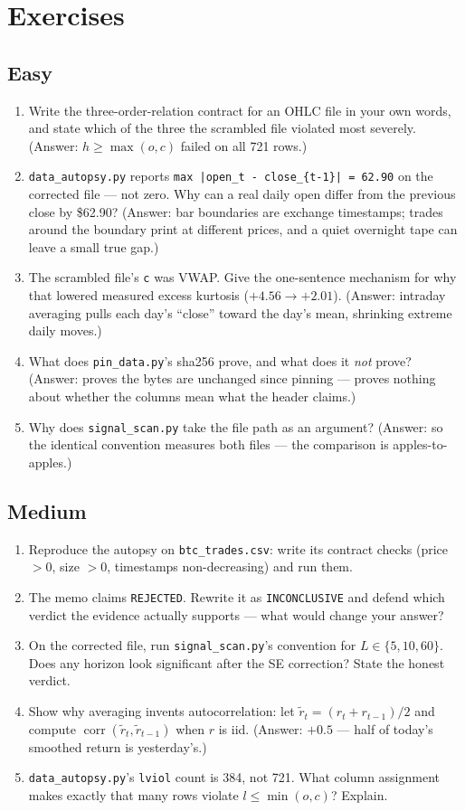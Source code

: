 \section*{Exercises}
\subsection*{Easy}
\begin{enumerate}
\item Write the three-order-relation contract for an OHLC file
in your own words, and state which of the three the scrambled
file violated most severely. (Answer: $h\ge\max(o,c)$ failed
on all 721 rows.)
\item \texttt{data\_autopsy.py} reports
\texttt{max |open\_t - close\_\{t-1\}| = 62.90} on the
corrected file --- not zero. Why can a real daily open differ
from the previous close by \$62.90? (Answer: bar boundaries are
exchange timestamps; trades around the boundary print at
different prices, and a quiet overnight tape can leave a small
true gap.)
\item The scrambled file's \texttt{c} was VWAP. Give the
one-sentence mechanism for why that lowered measured excess
kurtosis ($+4.56\to+2.01$). (Answer: intraday averaging pulls
each day's ``close'' toward the day's mean, shrinking extreme
daily moves.)
\item What does \texttt{pin\_data.py}'s sha256 prove, and what
does it \emph{not} prove? (Answer: proves the bytes are
unchanged since pinning --- proves nothing about whether the
columns mean what the header claims.)
\item Why does \texttt{signal\_scan.py} take the file path as an
argument? (Answer: so the identical convention measures both
files --- the comparison is apples-to-apples.)
\end{enumerate}
\subsection*{Medium}
\begin{enumerate}
\item Reproduce the autopsy on \texttt{btc\_trades.csv}:
write its contract checks (price $>0$, size $>0$, timestamps
non-decreasing) and run them.
\item The memo claims \texttt{REJECTED}. Rewrite it as
\texttt{INCONCLUSIVE} and defend which verdict the evidence
actually supports --- what would change your answer?
\item On the corrected file, run \texttt{signal\_scan.py}'s
convention for $L\in\{5,10,60\}$. Does any horizon look
significant after the SE correction? State the honest verdict.
\item Show why averaging invents autocorrelation: let
$\tilde r_t=(r_t+r_{t-1})/2$ and compute
$\operatorname{corr}(\tilde r_t,\tilde r_{t-1})$ when $r$ is
iid. (Answer: $+0.5$ --- half of today's smoothed return is
yesterday's.)
\item \texttt{data\_autopsy.py}'s \texttt{lviol} count is 384,
not 721. What column assignment makes exactly that many rows
violate $l\le\min(o,c)$? Explain.
\end{enumerate}
